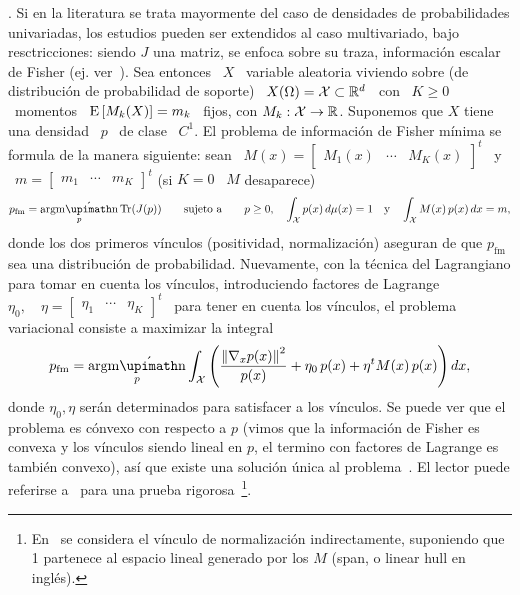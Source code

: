 .  Si  en la
literatura  se  trata  mayormente  del  caso  de  densidades  de  probabilidades
univariadas,  los estudios  pueden  ser extendidos  al  caso multivariado,  bajo
resctricciones: siendo $J$  una matriz, se enfoca sobre  su traza, informaci\'on
escalar de Fisher (ej.  ver~\cite{Fri98, Fri04}).  Sea entonces \ $X$ \ variable
aleatoria  viviendo  sobre (de  distribuci\'on  de  probabilidad de  soporte)  \
$X(\Omega) =  \mathcal{X} \subset \mathbb{R}^d$  \ con  \ $K \ge  0$ \ momentos  \ $\operatorname{E}\left[
M_k(X) \right] = m_k$ \ fijos, con  $M_k: \mathcal{X} \to \mathbb{R}$. Suponemos que $X$ tiene
una densidad \  $p$ \ de clase  \ $C^1$. El problema de  informaci\'on de Fisher
m\'inima  se formula  de la  manera siguiente:  sean \  $M(x) =  \begin{bmatrix}
M_1(x)  & \cdots  &  M_K(x) \end{bmatrix}^t$  \  y \  $m  = \begin{bmatrix}  m_1
& \cdots & m_K \end{bmatrix}^t$ (si $K = 0$ \ $M$ desaparece)
%
\[
p_{\mathrm{fm}}  =   \argmin_p  \Tr(J(p))  \qquad   \mbox{sujeto  a}  \qquad   p  \ge
0, \quad \int_\X p(x) \, d\mu(x) = 1 \quad \mbox{y}
\quad \int_\X M(x) \, p(x) \, dx = m,
\]
%
donde los dos primeros v\'inculos (positividad, normalizaci\'on) aseguran de que
$p_{\mathrm{fm}}$  sea una  distribuci\'on de  probabilidad. Nuevamente,  con la
t\'ecnica del  Lagrangiano para  tomar en  cuenta los  v\'inculos, introduciendo
factores  de Lagrange  $\eta_0, \quad  \eta  = \begin{bmatrix}  \eta_1 &  \cdots
& \eta_K  \end{bmatrix}^t$ \ para  tener en  cuenta los v\'inculos,  el problema
variacional  consiste  a  maximizar la  integral~\cite{GelFom63,  Bru04,  Mil00,
CamMar09, CovTho06}
%
\[
p_{\mathrm{fm}}    =   \argmin_p    \int_\X   \left(    \frac{\left\|   \nabla_x
  p(x) \right\|^2}{p(x)} + \eta_0 \, p(x) + \eta^t M(x) \, p(x) \right) dx,
\]
%
donde $\eta_0, \eta$  ser\'an determinados para satisfacer a  los v\'inculos. Se
puede ver  que el problema  es c\'onvexo  con respecto a  $p$ (\ie vimos  que la
informaci\'on de  Fisher es convexa  y los v\'inculos  siendo lineal en  $p$, el
termino con  factores de Lagrange es  tambi\'en convexo), as\'i que  existe una
soluci\'on \'unica  al problema~\cite{GelFom63,  Wei74, Bru04,  Mil00, CamMar09,
Cla13,  Kom14}.  El lector  puede  referirse  a~\cite[Teo.~2.1]{Bor95} para  una
prueba   rigorosa~\footnote{En~\cite{Bor95}  se   considera   el  v\'inculo   de
normalizaci\'on  indirectamente, suponiendo  que 1  partenece al  espacio lineal
generado por los $M$ (span, o linear hull en ingl\'es).}.

